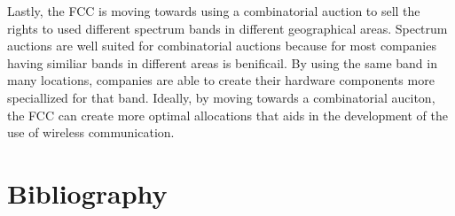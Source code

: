 \documentclass[10pt,onecolumn,letterpaper]{article}
\begin{document}
Lastly, the FCC is moving towards using a combinatorial auction to sell the rights to used different spectrum bands in different geographical areas. Spectrum auctions are well suited for combinatorial auctions because for most companies having similiar bands in different areas is benificail. By using the same band in many locations, companies are able to create their hardware components more speciallized for that band. Ideally, by moving towards a combinatorial auciton, the FCC can create more optimal allocations that aids in the development of the use of wireless communication.




\section{Bibliography}
\end{document}
